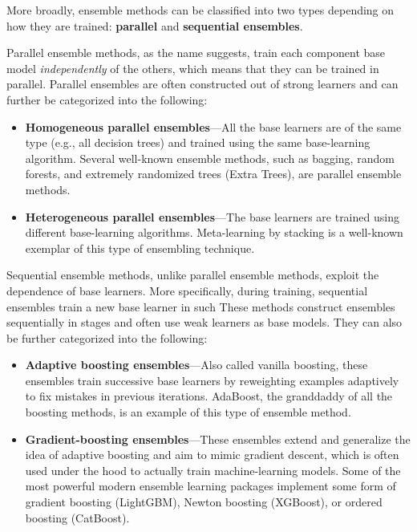 More broadly, ensemble methods can be classified into two types depending on
how they are trained: \textbf{parallel} and \textbf{sequential ensembles}.

Parallel ensemble methods, as the name suggests, train each component base
model \textit{independently} of the others, which means that they can be trained in parallel.
Parallel ensembles are often constructed out of strong learners and can further be categorized into the following:
\begin{itemize}
    \item \textbf{Homogeneous parallel ensembles}—All the base learners are of the same type (e.g.,
          all decision trees) and trained using the same base-learning algorithm. Several
          well-known ensemble methods, such as bagging, random forests, and extremely
          randomized trees (Extra Trees), are parallel ensemble methods.
    \item \textbf{Heterogeneous parallel ensembles}—The base learners are trained using different
          base-learning algorithms. Meta-learning by stacking is a well-known exemplar of
          this type of ensembling technique.
\end{itemize}

Sequential ensemble methods, unlike parallel ensemble methods, exploit the dependence of base learners. More specifically, during training, sequential ensembles train a new base learner in such  These methods construct ensembles sequentially in stages and often use weak learners as base models. They can also be further categorized into the following:

\begin{itemize}
    \item \textbf{Adaptive boosting ensembles}—Also called vanilla boosting, these ensembles train
          successive base learners by reweighting examples adaptively to fix mistakes in previous iterations. AdaBoost, the granddaddy of all the boosting methods, is
          an example of this type of ensemble method.
    \item \textbf{Gradient-boosting ensembles}—These ensembles extend and generalize the idea of
          adaptive boosting and aim to mimic gradient descent, which is often used
          under the hood to actually train machine-learning models. Some of the most
          powerful modern ensemble learning packages implement some form of gradient boosting (LightGBM), Newton boosting (XGBoost),
          or ordered boosting (CatBoost).
\end{itemize}

